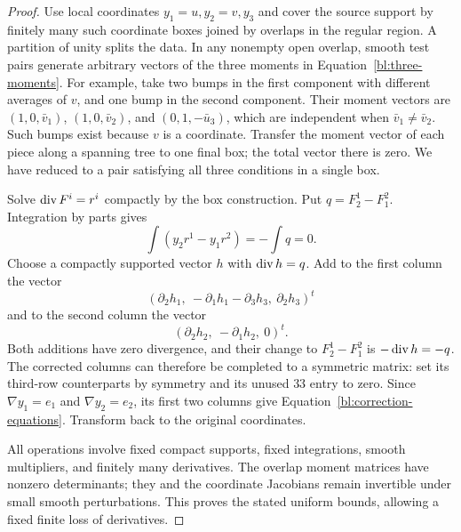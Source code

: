 \begin{proof}
Use local coordinates $y_1=u,y_2=v,y_3$ and cover the source support by
finitely many such coordinate boxes joined by overlaps in the regular
region.  A partition of unity splits the data.  In any nonempty open
overlap, smooth test pairs generate arbitrary vectors of the three
moments in Equation~\eqref{bl:three-moments}.  For example, take two bumps
in the first component with different averages of $v$, and one bump in
the second component.  Their moment vectors are
$(1,0,\bar v_1)$, $(1,0,\bar v_2)$, and $(0,1,-\bar u_3)$, which are
independent when $\bar v_1\ne\bar v_2$.  Such bumps exist because $v$
is a coordinate.  Transfer the moment vector of each piece along a
spanning tree to one final box; the total vector there is zero.  We have
reduced to a pair satisfying all three conditions in a single box.

Solve $\operatorname{div} F^i=r^i$ compactly by the box construction.  Put
$q=F^1_2-F^2_1$.  Integration by parts gives
\[
 \int(y_2r^1-y_1r^2)=-\int q=0.
\]
Choose a compactly supported vector $h$ with $\operatorname{div} h=q$.  Add to the
first column the vector
\[
 (\partial_2h_1,\ -\partial_1h_1-\partial_3h_3,\ \partial_2h_3)^t
\]
and to the second column the vector
\[
 (\partial_2h_2,\ -\partial_1h_2,\ 0)^t.
\]
Both additions have zero divergence, and their change to
$F^1_2-F^2_1$ is $-\operatorname{div} h=-q$.  The corrected columns can therefore
be completed to a symmetric matrix: set its third-row counterparts by
symmetry and its unused $33$ entry to zero.  Since
$\nabla y_1=e_1$ and $\nabla y_2=e_2$, its first two columns give
Equation~\eqref{bl:correction-equations}.  Transform back to the original
coordinates.

All operations involve fixed compact supports, fixed integrations,
smooth multipliers, and finitely many derivatives.  The overlap moment
matrices have nonzero determinants; they and the coordinate Jacobians
remain invertible under small smooth perturbations.  This proves the
stated uniform bounds, allowing a fixed finite loss of derivatives.
\end{proof}

